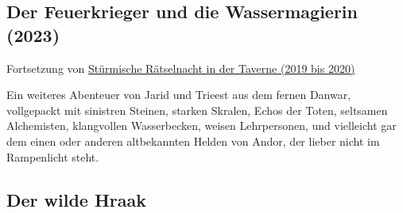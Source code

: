\begin{chapterbox}
    \chapter{Der Feuerkrieger und die Wassermagierin (2023)}
    \label{2023-der-feuerkrieger-und-die-wassermagierin}

    \begin{center}
        Fortsetzung von \hyperref[2019-2020-stuermische-raetselnacht-in-der-taverne]{Stürmische Rätselnacht in der Taverne (2019 bis 2020)}
    \end{center}
    
    Ein weiteres Abenteuer von Jarid und Trieest aus dem fernen Danwar, vollgepackt mit sinistren Steinen, starken Skralen, Echos der Toten, seltsamen Alchemisten, klangvollen Wasserbecken, weisen Lehrpersonen, und vielleicht gar dem einen oder anderen altbekannten Helden von Andor, der lieber nicht im Rampenlicht steht.



    
    
\end{chapterbox}


\newpage
\section{Der wilde Hraak}

